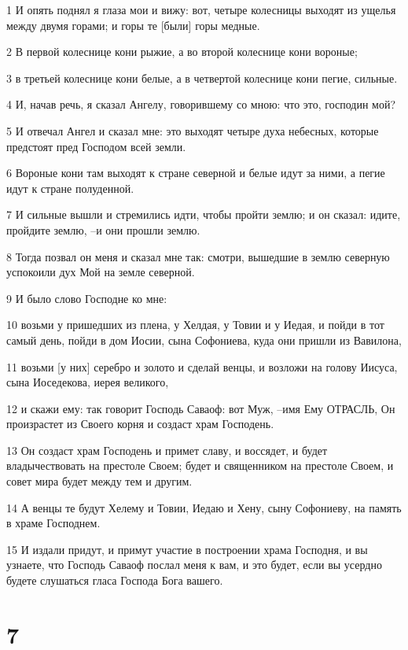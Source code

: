 \par 1 И опять поднял я глаза мои и вижу: вот, четыре колесницы выходят из ущелья между двумя горами; и горы те [были] горы медные.
\par 2 В первой колеснице кони рыжие, а во второй колеснице кони вороные;
\par 3 в третьей колеснице кони белые, а в четвертой колеснице кони пегие, сильные.
\par 4 И, начав речь, я сказал Ангелу, говорившему со мною: что это, господин мой?
\par 5 И отвечал Ангел и сказал мне: это выходят четыре духа небесных, которые предстоят пред Господом всей земли.
\par 6 Вороные кони там выходят к стране северной и белые идут за ними, а пегие идут к стране полуденной.
\par 7 И сильные вышли и стремились идти, чтобы пройти землю; и он сказал: идите, пройдите землю, --и они прошли землю.
\par 8 Тогда позвал он меня и сказал мне так: смотри, вышедшие в землю северную успокоили дух Мой на земле северной.
\par 9 И было слово Господне ко мне:
\par 10 возьми у пришедших из плена, у Хелдая, у Товии и у Иедая, и пойди в тот самый день, пойди в дом Иосии, сына Софониева, куда они пришли из Вавилона,
\par 11 возьми [у них] серебро и золото и сделай венцы, и возложи на голову Иисуса, сына Иоседекова, иерея великого,
\par 12 и скажи ему: так говорит Господь Саваоф: вот Муж, --имя Ему ОТРАСЛЬ, Он произрастет из Своего корня и создаст храм Господень.
\par 13 Он создаст храм Господень и примет славу, и воссядет, и будет владычествовать на престоле Своем; будет и священником на престоле Своем, и совет мира будет между тем и другим.
\par 14 А венцы те будут Хелему и Товии, Иедаю и Хену, сыну Софониеву, на память в храме Господнем.
\par 15 И издали придут, и примут участие в построении храма Господня, и вы узнаете, что Господь Саваоф послал меня к вам, и это будет, если вы усердно будете слушаться гласа Господа Бога вашего.

\chapter{7}

